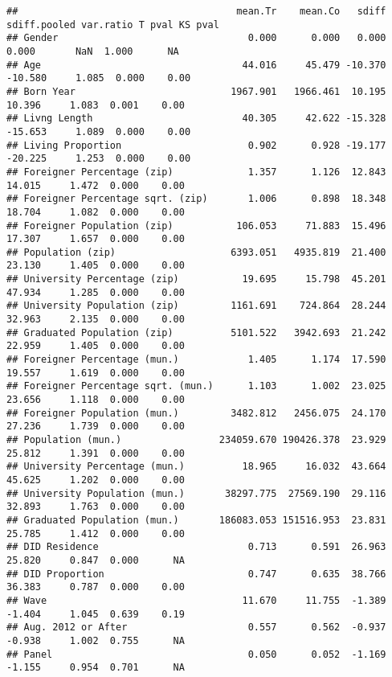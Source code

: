 \documentclass[
]{article}
\newenvironment{Shaded}{\begin{snugshade}}{\end{snugshade}}
\newcommand{\CommentTok}[1]{\textcolor[rgb]{0.56,0.35,0.01}{\textit{#1}}}
\newcommand{\DecValTok}[1]{\textcolor[rgb]{0.00,0.00,0.81}{#1}}
\newcommand{\KeywordTok}[1]{\textcolor[rgb]{0.13,0.29,0.53}{\textbf{#1}}}
\newcommand{\NormalTok}[1]{#1}
\newcommand{\OperatorTok}[1]{\textcolor[rgb]{0.81,0.36,0.00}{\textbf{#1}}}
\newcommand{\StringTok}[1]{\textcolor[rgb]{0.31,0.60,0.02}{#1}}
\begin{document}
\begin{Shaded}
\end{Shaded}

\begin{verbatim}
##                                      mean.Tr    mean.Co   sdiff sdiff.pooled var.ratio T pval KS pval
## Gender                                 0.000      0.000   0.000        0.000       NaN  1.000      NA
## Age                                   44.016     45.479 -10.370      -10.580     1.085  0.000    0.00
## Born Year                           1967.901   1966.461  10.195       10.396     1.083  0.001    0.00
## Livng Length                          40.305     42.622 -15.328      -15.653     1.089  0.000    0.00
## Living Proportion                      0.902      0.928 -19.177      -20.225     1.253  0.000    0.00
## Foreigner Percentage (zip)             1.357      1.126  12.843       14.015     1.472  0.000    0.00
## Foreigner Percentage sqrt. (zip)       1.006      0.898  18.348       18.704     1.082  0.000    0.00
## Foreigner Population (zip)           106.053     71.883  15.496       17.307     1.657  0.000    0.00
## Population (zip)                    6393.051   4935.819  21.400       23.130     1.405  0.000    0.00
## University Percentage (zip)           19.695     15.798  45.201       47.934     1.285  0.000    0.00
## University Population (zip)         1161.691    724.864  28.244       32.963     2.135  0.000    0.00
## Graduated Population (zip)          5101.522   3942.693  21.242       22.959     1.405  0.000    0.00
## Foreigner Percentage (mun.)            1.405      1.174  17.590       19.557     1.619  0.000    0.00
## Foreigner Percentage sqrt. (mun.)      1.103      1.002  23.025       23.656     1.118  0.000    0.00
## Foreigner Population (mun.)         3482.812   2456.075  24.170       27.236     1.739  0.000    0.00
## Population (mun.)                 234059.670 190426.378  23.929       25.812     1.391  0.000    0.00
## University Percentage (mun.)          18.965     16.032  43.664       45.625     1.202  0.000    0.00
## University Population (mun.)       38297.775  27569.190  29.116       32.893     1.763  0.000    0.00
## Graduated Population (mun.)       186083.053 151516.953  23.831       25.785     1.412  0.000    0.00
## DID Residence                          0.713      0.591  26.963       25.820     0.847  0.000      NA
## DID Proportion                         0.747      0.635  38.766       36.383     0.787  0.000    0.00
## Wave                                  11.670     11.755  -1.389       -1.404     1.045  0.639    0.19
## Aug. 2012 or After                     0.557      0.562  -0.937       -0.938     1.002  0.755      NA
## Panel                                  0.050      0.052  -1.169       -1.155     0.954  0.701      NA
\end{verbatim}
\end{document}
